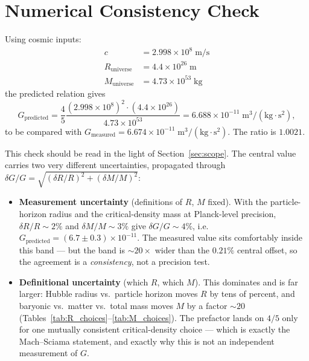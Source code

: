 \documentclass[11pt,letterpaper]{article}
\newcommand{\Runiv}{R_{\mathrm{universe}}}
\newcommand{\Muniv}{M_{\mathrm{universe}}}
\begin{document}
\section{Numerical Consistency Check}
\label{sec:numerical}

Using cosmic inputs:
\begin{align}
  c &= 2.998 \times 10^8 \; \mathrm{m/s} \\
  \Runiv &= 4.4 \times 10^{26} \; \mathrm{m} \\
  \Muniv &= 4.73 \times 10^{53} \; \mathrm{kg}
\end{align}
the predicted relation gives
\begin{equation}
  G_{\mathrm{predicted}}
  = \frac{4}{5} \frac{(2.998 \times 10^8)^2 \cdot (4.4 \times 10^{26})}
                     {4.73 \times 10^{53}}
  = 6.688 \times 10^{-11} \; \mathrm{m^3/(kg{\cdot}s^2)},
  \label{eq:g_derived}
\end{equation}
to be compared with $G_{\mathrm{measured}} = 6.674 \times 10^{-11}\;
\mathrm{m^3/(kg{\cdot}s^2)}$. The ratio is $1.0021$.

This check should be read in the light of Section~\ref{sec:scope}. The central
value carries two very different uncertainties, propagated through
$\delta G/G = \sqrt{(\delta R/R)^2 + (\delta M/M)^2}$:

\begin{itemize}
  \item \textbf{Measurement uncertainty} (definitions of $R$, $M$ fixed). With
    the particle-horizon radius and the critical-density mass at Planck-level
    precision, $\delta R/R \sim 2\%$ and $\delta M/M \sim 3\%$ give
    $\delta G/G \sim 4\%$, i.e.\ $G_{\mathrm{predicted}} = (6.7 \pm 0.3)\times
    10^{-11}$. The measured value sits comfortably inside this band --- but the
    band is $\sim 20\times$ wider than the $0.21\%$ central offset, so the
    agreement is a \emph{consistency}, not a precision test.
  \item \textbf{Definitional uncertainty} (which $R$, which $M$). This dominates
    and is far larger: Hubble radius vs.\ particle horizon moves $R$ by tens of
    percent, and baryonic vs.\ matter vs.\ total mass moves $M$ by a factor
    $\sim 20$ (Tables~\ref{tab:R_choices}--\ref{tab:M_choices}). The prefactor
    lands on $4/5$ only for one mutually consistent critical-density choice ---
    which is exactly the Mach--Sciama statement, and exactly why this is not an
    independent measurement of $G$.
\end{itemize}
\end{document}
